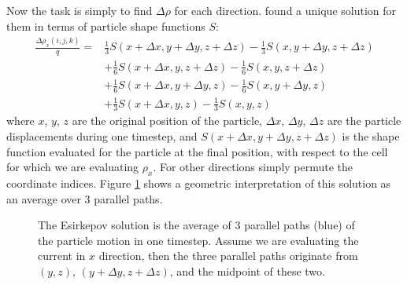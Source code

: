 Now the task is simply to find $\Delta\rho$ for each direction.
\citet{esirkepov_exact_2001} found a unique solution for them in terms of
particle shape functions $S$:
\begin{equation}
  \label{eq:esirkepov-solution}
  \begin{split}
    \frac{\Delta \rho_{x}(i, j, k)}{q} = &\frac{1}{3}S(x + \Delta x, y + \Delta y, z + \Delta z) - \frac{1}{3}S(x, y + \Delta y, z + \Delta z) \\
    &+ \frac{1}{6}S(x + \Delta x, y, z + \Delta z) - \frac{1}{6}S(x, y, z + \Delta z) \\
    &+ \frac{1}{6}S(x + \Delta x, y + \Delta y, z) - \frac{1}{6}S(x, y + \Delta y, z) \\
    &+ \frac{1}{3}S(x + \Delta x, y, z) - \frac{1}{3}S(x, y, z)
  \end{split}
\end{equation}
where $x$, $y$, $z$ are the original position of the particle, $\Delta x$,
$\Delta y$, $\Delta z$ are the particle displacements during one timestep, and
$S(x + \Delta x, y + \Delta y, z + \Delta z)$ is the shape function evaluated
for the particle at the final position, with respect to the cell for which we
are evaluating $\rho_{x}$. For other directions simply permute the coordinate
indices. Figure \ref{fig:esirkepov-average} shows a geometric interpretation of
this solution as an average over 3 parallel paths.

\begin{figure}[h]
  \centering
  \caption[Illustration of the Esirkepov solution in 3D.]{The Esirkepov solution
    is the average of 3 parallel paths (blue) of the particle motion in one
    timestep. Assume we are evaluating the current in $x$ direction, then the
    three parallel paths originate from $(y, z)$, $(y + \Delta y, z + \Delta
    z)$, and the midpoint of these two.}
  \label{fig:esirkepov-average}
\end{figure}


